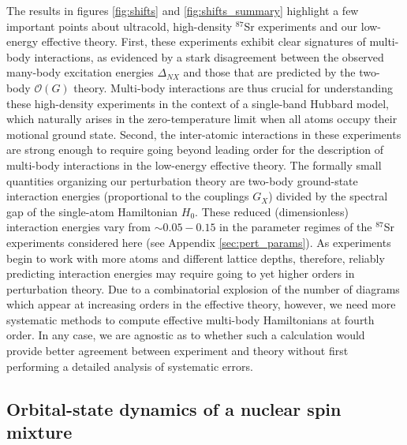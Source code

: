 \documentclass[preprint,showkeys,nofootinbib]{revtex4-1}
\newcommand{\p}[1]{\left(#1\right)} %
\renewcommand{\O}{\mathcal{O}}
\newcommand{\1}{\mathds{1}}
\begin{document}
The results in figures \ref{fig:shifts} and \ref{fig:shifts_summary}
highlight a few important points about ultracold, high-density
${}^{87}$Sr experiments and our low-energy effective theory.  First,
these experiments exhibit clear signatures of multi-body interactions,
as evidenced by a stark disagreement between the observed many-body
excitation energies $\Delta_{NX}$ and those that are predicted by the
two-body $\O\p{G}$ theory.  Multi-body interactions are thus crucial
for understanding these high-density experiments in the context of a
single-band Hubbard model, which naturally arises in the
zero-temperature limit when all atoms occupy their motional ground
state.  Second, the inter-atomic interactions in these experiments are
strong enough to require going beyond leading order for the
description of multi-body interactions in the low-energy effective
theory.  The formally small quantities organizing our perturbation
theory are two-body ground-state interaction energies (proportional to
the couplings $G_X$) divided by the spectral gap of the single-atom
Hamiltonian $H_0$.  These reduced (dimensionless) interaction energies
vary from $\sim0.05-0.15$ in the parameter regimes of the ${}^{87}$Sr
experiments considered here (see Appendix \ref{sec:pert_params}).  As
experiments begin to work with more atoms and different lattice
depths, therefore, reliably predicting interaction energies may
require going to yet higher orders in perturbation theory.  Due to a
combinatorial explosion of the number of diagrams which appear at
increasing orders in the effective theory, however, we need more
systematic methods to compute effective multi-body Hamiltonians at
fourth order.  In any case, we are agnostic as to whether such a
calculation would provide better agreement between experiment and
theory without first performing a detailed analysis of systematic
errors.


\subsection{Orbital-state dynamics of a nuclear spin mixture}
\end{document}

